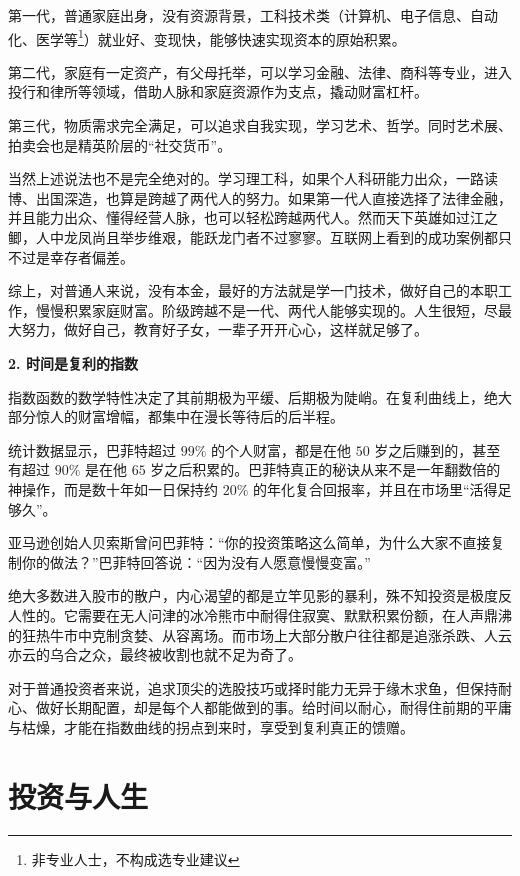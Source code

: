 \documentclass[12pt,openany]{book}
\newcommand{\subhead}[1]{%
    \par\vspace{0.5\baselineskip}%
    \noindent\textbf{#1}\par%
    \vspace{0.5\baselineskip}%
}
\begin{document}
第一代，普通家庭出身，没有资源背景，工科技术类（计算机、电子信息、自动化、医学等\footnote{非专业人士，不构成选专业建议}）就业好、变现快，能够快速实现资本的原始积累。

第二代，家庭有一定资产，有父母托举，可以学习金融、法律、商科等专业，进入投行和律所等领域，借助人脉和家庭资源作为支点，撬动财富杠杆。

第三代，物质需求完全满足，可以追求自我实现，学习艺术、哲学。同时艺术展、拍卖会也是精英阶层的“社交货币”。

当然上述说法也不是完全绝对的。学习理工科，如果个人科研能力出众，一路读博、出国深造，也算是跨越了两代人的努力。如果第一代人直接选择了法律金融，并且能力出众、懂得经营人脉，也可以轻松跨越两代人。然而天下英雄如过江之鲫，人中龙凤尚且举步维艰，能跃龙门者不过寥寥。互联网上看到的成功案例都只不过是幸存者偏差。

综上，对普通人来说，没有本金，最好的方法就是学一门技术，做好自己的本职工作，慢慢积累家庭财富。阶级跨越不是一代、两代人能够实现的。人生很短，尽最大努力，做好自己，教育好子女，一辈子开开心心，这样就足够了。

\newpage

\subhead{2. 时间是复利的指数}

指数函数的数学特性决定了其前期极为平缓、后期极为陡峭。在复利曲线上，绝大部分惊人的财富增幅，都集中在漫长等待后的后半程。

统计数据显示，巴菲特超过 $99\%$ 的个人财富，都是在他 $50$ 岁之后赚到的，甚至有超过 $90\%$ 是在他 $65$ 岁之后积累的。巴菲特真正的秘诀从来不是一年翻数倍的神操作，而是数十年如一日保持约 $20\%$ 的年化复合回报率，并且在市场里“活得足够久”。

亚马逊创始人贝索斯曾问巴菲特：“你的投资策略这么简单，为什么大家不直接复制你的做法？”巴菲特回答说：“因为没有人愿意慢慢变富。”

绝大多数进入股市的散户，内心渴望的都是立竿见影的暴利，殊不知投资是极度反人性的。它需要在无人问津的冰冷熊市中耐得住寂寞、默默积累份额，在人声鼎沸的狂热牛市中克制贪婪、从容离场。而市场上大部分散户往往都是追涨杀跌、人云亦云的乌合之众，最终被收割也就不足为奇了。

对于普通投资者来说，追求顶尖的选股技巧或择时能力无异于缘木求鱼，但保持耐心、做好长期配置，却是每个人都能做到的事。给时间以耐心，耐得住前期的平庸与枯燥，才能在指数曲线的拐点到来时，享受到复利真正的馈赠。

\section{投资与人生}
\end{document}
